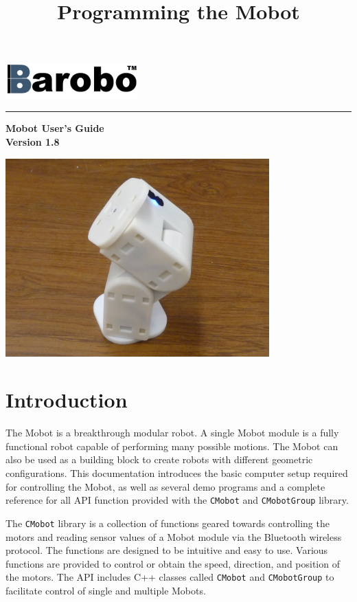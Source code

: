 \documentclass{article}
\title{Programming the Mobot}
\begin{document}
\includegraphics[width=2in]{images/Barobo.png}
\hrule
\begin{center}
\vspace*{2.5cm}
{\Huge\sf\bf Mobot User's Guide}\\
\vspace*{2.5cm}
{\Large\bf Version 1.8}
\vspace{4.5cm}

\includegraphics[width=4in]{images/Mobot_Camera_Stand.JPG}
\end{center}


\newpage
\tableofcontents
\newpage
\section{Introduction}
The Mobot is a breakthrough modular robot. A single Mobot module is a fully 
functional robot capable of performing many possible motions. The Mobot
can also be used as a building block to create robots with different
geometric configurations. 
This documentation introduces the basic computer setup required for controlling 
the Mobot, as well as several demo programs and a complete reference for all
API function provided with the \texttt{CMobot} and \texttt{CMobotGroup} library.

The \texttt{CMobot} library is a collection of functions geared towards
controlling the motors and reading sensor values of a Mobot module via the
Bluetooth wireless protocol. The functions are designed to be intuitive
and easy to use. Various functions are provided to control or obtain the speed,
direction, and position of the motors. The API includes C++ classes called
\texttt{CMobot} and \texttt{CMobotGroup} to facilitate control of 
single and multiple Mobots.
\end{document}
